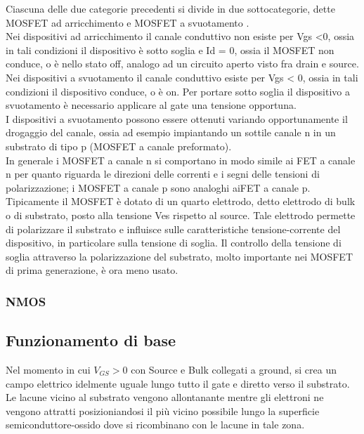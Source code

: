 Ciascuna delle due categorie precedenti si divide in due sottocategorie, dette MOSFET ad arricchimento e MOSFET a svuotamento .\\
Nei dispositivi ad arricchimento il canale conduttivo non esiste per Vgs <0,
ossia in tali condizioni il dispositivo è sotto soglia e Id = 0, ossia il MOSFET non
conduce, o è nello stato off, analogo ad un circuito aperto visto fra drain e source.\\

Nei dispositivi a svuotamento il canale conduttivo esiste per Vgs < 0, ossia in tali
condizioni il dispositivo conduce, o è on. Per portare sotto soglia il dispositivo a
svuotamento è necessario applicare al gate una tensione opportuna.\\
I dispositivi a svuotamento possono essere ottenuti variando opportunamente il drogaggio del canale, ossia ad esempio impiantando un sottile canale n in un substrato di tipo p (MOSFET a canale preformato). \\
In generale i MOSFET a canale n si comportano in modo simile ai FET a canale n per quanto riguarda le direzioni delle correnti e i segni delle tensioni di polarizzazione; i MOSFET a canale p sono analoghi aiFET a canale p.\\
Tipicamente il MOSFET è dotato di un quarto elettrodo, detto elettrodo di
bulk o di substrato, posto alla tensione Ves rispetto al source. Tale elettrodo permette di polarizzare il substrato e influisce sulle caratteristiche tensione-corrente
del dispositivo, in particolare sulla tensione di soglia. Il controllo della tensione di
soglia attraverso la polarizzazione del substrato, molto importante nei MOSFET
di prima generazione, è ora meno usato.
%
\cleardoublepage
%
\subsubsection{NMOS}
\subsection{Funzionamento di base}
Nel momento in cui $V_{GS}>0$  con Source e Bulk collegati a ground, si crea un campo elettrico idelmente uguale lungo tutto il gate e diretto verso il substrato. Le lacune vicino al substrato vengono allontanante mentre gli elettroni ne vengono attratti posizioniandosi il più vicino possibile lungo la superficie semiconduttore-ossido dove si ricombinano con le lacune in tale zona.

